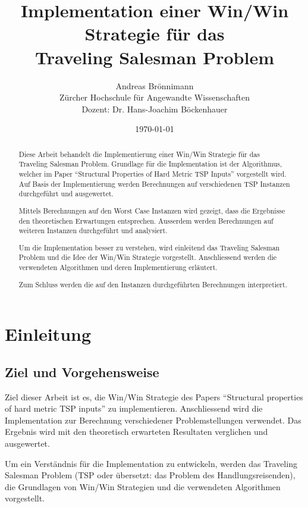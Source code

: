 \documentclass[11pt,a4paper]{article}
\title {Implementation einer Win/Win Strategie für das \\ 
Traveling Salesman Problem\\}
\author {Andreas Brönnimann\\
Zürcher Hochschule für Angewandte Wissenschaften\\
Dozent: Dr. Hans-Joachim Böckenhauer}
\date {\today}
\begin{document}
\nocite{*}

\maketitle
\setcounter{page}{0}
\thispagestyle{empty}
\newpage

\begin{abstract}
    Diese Arbeit behandelt die Implementierung einer Win/Win Strategie für das Traveling Salesman Problem. Grundlage für die Implementation ist der Algorithmus, welcher im Paper "`Structural Properties of Hard Metric TSP Inputs"'\cite{moemke11} vorgestellt wird. Auf Basis der Implementierung werden Berechnungen auf verschiedenen TSP Instanzen durchgeführt und ausgewertet.

    Mittels Berechnungen auf den Worst Case Instanzen wird gezeigt, dass die Ergebnisse den theoretischen Erwartungen entsprechen. Ausserdem werden Berechnungen auf weiteren Instanzen durchgeführt und analysiert.

Um die Implementation  besser zu verstehen, wird einleitend das Traveling Salesman Problem und die Idee der Win/Win Strategie vorgestellt. Anschliessend werden die verwendeten Algorithmen und deren Implementierung erläutert.

Zum Schluss werden die auf den Instanzen durchgeführten Berechnungen interpretiert.
\end{abstract}

\newpage

\tableofcontents
\newpage
\section{Einleitung}
\subsection{Ziel und Vorgehensweise}
Ziel dieser Arbeit ist es, die Win/Win Strategie des Papers "`Structural properties of hard metric TSP inputs"'\cite{moemke11} zu implementieren. Anschliessend wird die Implementation zur Berechnung verschiedener Problemstellungen verwendet. Das Ergebnis wird mit den theoretisch erwarteten Resultaten verglichen und ausgewertet.

Um ein Verständnis für die Implementation zu entwickeln, werden das Traveling Salesman Problem (TSP oder übersetzt: das Problem des Handlungsreisenden), die Grundlagen von Win/Win Strategien und die verwendeten Algorithmen vorgestellt. 
\end{document}
